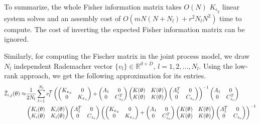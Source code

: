 \documentclass[article,ij4uq]{ij4uq}              %
\begin{document}
To summarize, the whole Fisher information matrix takes $O(N)$ $K_{\epsilon_{y}}$ linear system solves and an assembly cost of $O(mN(N+N_{l})+r^{2}N_{l}N^{2})$ time to  compute. The cost of inverting the expected Fisher information matrix can be ignored.
\par Similarly, for computing the Fischer matrix in the joint process model, we draw $N_{l}$ independent Rademacher vector $\{v_{l}\} \in \mathbb{R}^{d+D}$, $l=1,2,\ldots,N_l$. Using the low-rank approach, we get the following approximation for its entries. 
\begin{align}
    \hat{\mathcal{I}}_{i,j}(\theta)\approx&\frac{1}{2N_{l}}\sum_{l=1}^{N_{l}}v_{l}^{T}\left(\begin{pmatrix}K_{\epsilon_{y}}&0\\0&K_{\epsilon_{z}}\end{pmatrix}+\begin{pmatrix}A_{1}&0\\0&C_{z_{o}}^{T}\end{pmatrix}\begin{pmatrix}K(\theta)&K(\theta)\\K(\theta)&K(\theta)\end{pmatrix}\begin{pmatrix}A_{1}^{T}&0\\0&C_{z_{o}}\end{pmatrix}\right)^{-1}\begin{pmatrix}A_{1}&0\\0&C_{z_{o}}^{T}\end{pmatrix}\notag\\
    &\begin{pmatrix}K_{i}(\theta)&K_{i}(\theta)\\K_{i}(\theta)&K_{i}(\theta)\end{pmatrix}\begin{pmatrix}A_{1}^{T}&0\\0&C_{z_{o}}\end{pmatrix}\left(\begin{pmatrix}K_{\epsilon_{y}}&0\\0&K_{\epsilon_{z}}\end{pmatrix}+\begin{pmatrix}A_{1}&0\\0&C_{z_{o}}^{T}\end{pmatrix}\begin{pmatrix}K(\theta)&K(\theta)\\K(\theta)&K(\theta)\end{pmatrix}\begin{pmatrix}A_{1}^{T}&0\\0&C_{z_{o}}\end{pmatrix}\right)^{-1}\notag\\

\end{align}
\end{document}
